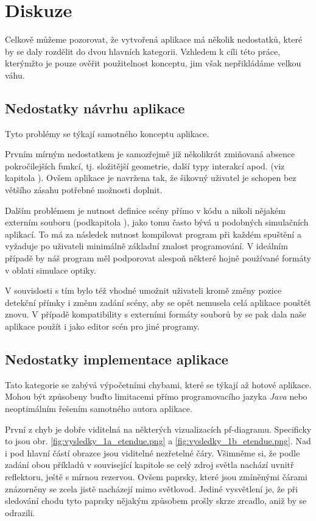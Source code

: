\chapter{Diskuze}

Celkově můžeme pozorovat, že vytvořená aplikace má několik nedostatků, které by se daly rozdělit do dvou hlavních kategorii. Vzhledem k cíli této práce, kterýmžto je pouze ověřit použitelnost konceptu, jim však nepřikládáme velkou váhu.

\section{Nedostatky návrhu aplikace}

Tyto problémy se týkají samotného konceptu aplikace.

Prvním mírným nedostatkem je samozřejmě již několikrát zmiňovaná absence pokročilejších funkcí, tj. složitější geometrie, další typy interakcí apod. (viz kapitola ). Ovšem aplikace je navržena tak, že šikovný uživatel je schopen bez většího zásahu potřebné možnosti doplnit.

Dalším problémem je nutnost definice scény přímo v kódu a nikoli nějakém externím souboru (podkapitola ), jako tomu často bývá u podobných simulačních aplikací. To má za následek nutnost kompilovat program při každém spuštění a vyžaduje po uživateli minimálně základní znalost programování. V ideálním případě by náš program měl podporovat alespoň některé hojně používané formáty v oblati simulace optiky.\src

V souvislosti s tím bylo též vhodné umožnit uživateli kromě změny pozice detekční přímky i změnu zadání scény, aby se opět nemusela celá aplikace pouštět znovu. V případě kompatibility s externími formáty souborů by se pak dala naše aplikace použít i jako editor scén pro jiné programy.

\section{Nedostatky implementace aplikace}

Tato kategorie se zabývá výpočetními chybami, které se týkají až hotové aplikace. Mohou být způsobeny buďto limitacemi přímo programovacího jazyka \emph{Java} nebo neoptimálním řešením samotného autora aplikace.

První z chyb je dobře viditelná na některých vizualizacích pf-diagramu. Specificky to jsou obr. \ref{fig:vysledky_1a_etendue.png} a \ref{fig:vysledky_1b_etendue.png}. Nad i pod hlavní částí obrazce jsou viditelné nezřetelné čáry. Všimněme si, že podle zadání obou příkladů v související kapitole  se celý zdroj světla nachází uvnitř reflektoru, ještě s mírnou rezervou. Ovšem paprsky, které jsou zmíněnými čárami znázorněny se zcela jistě nacházejí mimo světlovod. Jediné vysvětlení je, že při sledování chodu tyto paprsky nějakým způsobem prošly skrze zrcadlo, aniž by se odrazili.

